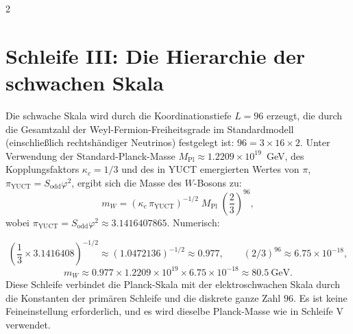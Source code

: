 \documentclass[12pt,a4paper]{article}
\begin{document}
\begin{multicols}{2}
		\section{Schleife III: Die Hierarchie der schwachen Skala}
		
		Die schwache Skala wird durch die Koordinationstiefe \(L = 96\) erzeugt, die durch die Gesamtzahl der Weyl-Fermion-Freiheitsgrade im Standardmodell (einschließlich rechtshändiger Neutrinos) festgelegt ist: \(96 = 3 \times 16 \times 2\). Unter Verwendung der Standard-Planck-Masse \(M_{\mathrm{Pl}} \approx 1.2209 \times 10^{19}\)~GeV, des Kopplungsfaktors \(\kappa_c = 1/3\) und des in YUCT emergierten Wertes von \(\pi\), \(\pi_{\mathrm{YUCT}} = S_{\mathrm{odd}}\varphi^2\), ergibt sich die Masse des \(W\)-Bosons zu:
		\begin{equation}
			\boxed{m_W = \left( \kappa_c \, \pi_{\mathrm{YUCT}} \right)^{-1/2} \; M_{\mathrm{Pl}} \; \left( \frac{2}{3} \right)^{96}},
		\end{equation}
		wobei \(\pi_{\mathrm{YUCT}} = S_{\mathrm{odd}}\varphi^2 \approx 3.1416407865\). Numerisch:
	\end{multicols}
	\small
	\[
	\left( \frac{1}{3} \times 3.1416408 \right)^{-1/2} \approx (1.0472136)^{-1/2} \approx 0.977,\qquad 
	(2/3)^{96} \approx 6.75 \times 10^{-18},
	\]
	\[
	m_W \approx 0.977 \times 1.2209 \times 10^{19} \times 6.75 \times 10^{-18} \approx 80.5\ \text{GeV}.
	\]
	Diese Schleife verbindet die Planck-Skala mit der elektroschwachen Skala durch die Konstanten der primären Schleife und die diskrete ganze Zahl \(96\). Es ist keine Feineinstellung erforderlich, und es wird dieselbe Planck-Masse wie in Schleife V verwendet.
\end{document}
